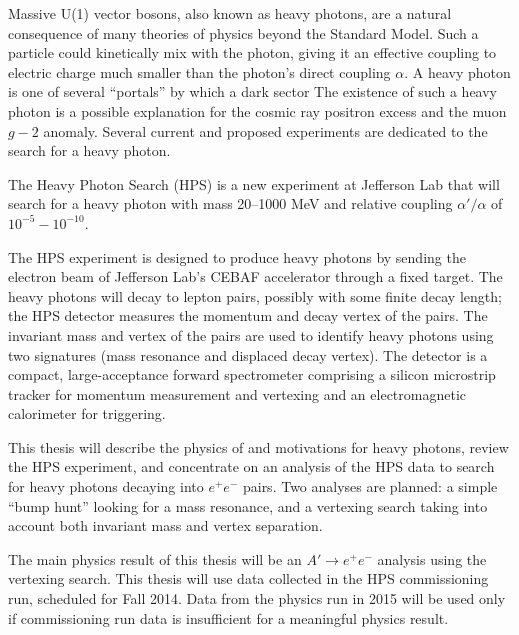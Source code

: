 Massive U(1) vector bosons, also known as heavy photons, are a natural consequence of many theories of physics beyond the Standard Model.
Such a particle could kinetically mix with the photon, giving it an effective coupling to electric charge much smaller than the photon's direct coupling $\alpha$.
A heavy photon is one of several ``portals'' by which a dark sector 
The existence of such a heavy photon is a possible explanation for the cosmic ray positron excess and the muon $g-2$ anomaly.
Several current and proposed experiments are dedicated to the search for a heavy photon.

The Heavy Photon Search (HPS) is a new experiment at Jefferson Lab that will search for a heavy photon with mass 20--1000 MeV and relative coupling $\alpha'/\alpha$ of $10^{-5}-10^{-10}$. 

The HPS experiment is designed to produce heavy photons by sending the electron beam of Jefferson Lab's CEBAF accelerator through a fixed target.
The heavy photons will decay to lepton pairs, possibly with some finite decay length; the HPS detector measures the momentum and decay vertex of the pairs.
The invariant mass and vertex of the pairs are used to identify heavy photons using two signatures (mass resonance and displaced decay vertex).
The detector is a compact, large-acceptance forward spectrometer comprising a silicon microstrip tracker for momentum measurement and vertexing and an electromagnetic calorimeter for triggering.

This thesis will describe the physics of and motivations for heavy photons, review the HPS experiment, and concentrate on an analysis of the HPS data to search for heavy photons decaying into $e^+e^-$ pairs.
Two analyses are planned: a simple ``bump hunt'' looking for a mass resonance, and a vertexing search taking into account both invariant mass and vertex separation.

The main physics result of this thesis will be an $A'\to e^+e^-$ analysis using the vertexing search.
This thesis will use data collected in the HPS commissioning run, scheduled for Fall 2014.
Data from the physics run in 2015 will be used only if commissioning run data is insufficient for a meaningful physics result.


